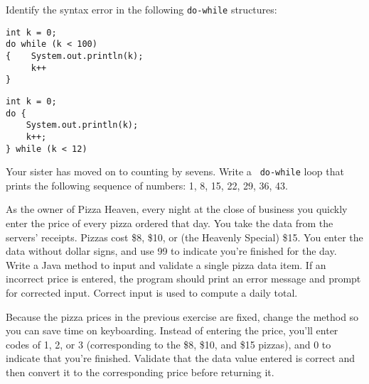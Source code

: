 

\begin{SSTUDY}
\item Identify the syntax error in the
following {\tt do-while} \mbox{structures:}
\begin{EXRLL}
\item

\begin{jjjlisting}
\begin{lstlisting}
int k = 0;
do while (k < 100)
{    System.out.println(k);
     k++
}
\end{lstlisting}
\end{jjjlisting}

\item

\begin{jjjlisting}
\begin{lstlisting}
int k = 0;
do {
    System.out.println(k);
    k++;
} while (k < 12)
\end{lstlisting}
\end{jjjlisting}
\end{EXRLL}


\item Your sister has moved on to counting by sevens. Write a {\tt
do-while} loop that prints the following sequence of numbers: 1, 8,
15, 22, 29, 36, 43.


\item  As the owner of Pizza Heaven, every night at the close of business you
quickly enter the price of every pizza ordered that day. You take the
data from the servers' receipts. Pizzas cost \$8, \$10, or (the
Heavenly Special) \$15. You enter the data without dollar signs, and
use 99 to indicate you're finished for the day.  Write a Java method to
input and validate a single pizza data item. If an incorrect price is
entered, the program should print an error message and prompt for
corrected input.  Correct input is used to compute a daily total.

\item  Because the pizza prices in the previous exercise are fixed, change
the method so you can save time on keyboarding. Instead of entering
the price, you'll enter codes of 1, 2, or 3 (corresponding to the
\$8, \$10, and \$15 pizzas), and 0 to indicate that you're finished. Validate that the
data value entered is correct and then convert it to the
corresponding price before returning it.

\end{SSTUDY}


